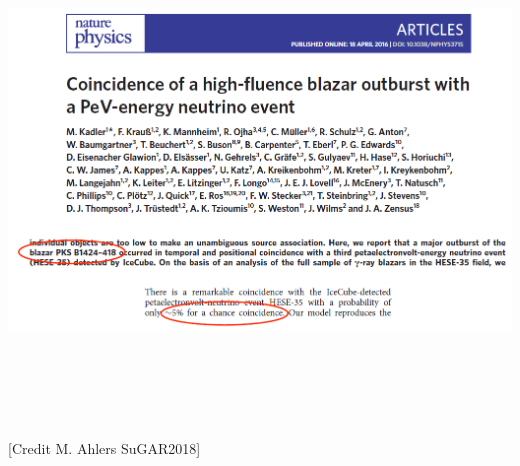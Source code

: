 \Tr
\onecolumn
\begin{center}
\includegraphics[keepaspectratio,height=14cm]{HESE35}\\
{\large [Credit M. Ahlers SuGAR2018]}
\end{center}

\Tr
\onecolumn
\vspace*{6cm}
\begin{center}
{\red {}}
\end{center}

